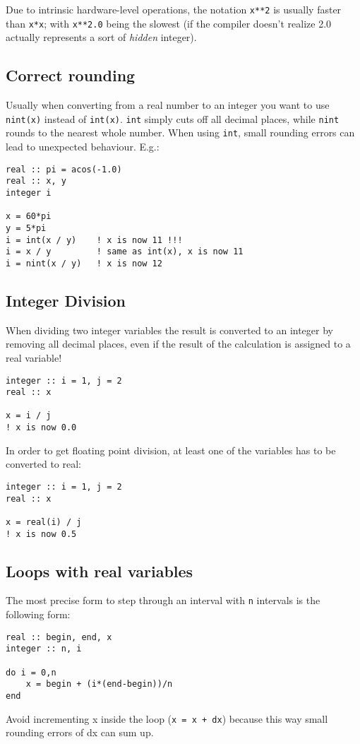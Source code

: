 \documentclass{article}
\begin{document}
Due to intrinsic hardware-level operations, the notation \verb|x**2| is usually faster than \verb|x*x|; with \verb|x**2.0| being the slowest (if the compiler doesn't realize 2.0 actually represents a sort of \emph{hidden} integer).

\subsection{Correct rounding}
Usually when converting from a real number to an integer you want to use \verb|nint(x)| instead of \verb|int(x)|. \verb|int| simply cuts off all decimal places, while \verb|nint| rounds to the nearest whole number. When using \verb|int|, small rounding errors can lead to unexpected behaviour. E.g.:

\begin{verbatim}
real :: pi = acos(-1.0)
real :: x, y
integer i

x = 60*pi
y = 5*pi
i = int(x / y)    ! x is now 11 !!!
i = x / y         ! same as int(x), x is now 11
i = nint(x / y)   ! x is now 12
\end{verbatim}

\subsection{Integer Division}

When dividing two integer variables the result is converted to an integer by removing all decimal places, even if the result of the calculation is assigned to a real variable!

\begin{verbatim}
integer :: i = 1, j = 2
real :: x

x = i / j
! x is now 0.0
\end{verbatim}

In order to get floating point division, at least one of the variables has to be converted to real:

\begin{verbatim}
integer :: i = 1, j = 2
real :: x

x = real(i) / j
! x is now 0.5
\end{verbatim}

\subsection{Loops with real variables}

The most precise form to step through an interval with \verb|n| intervals is the following form:

\begin{verbatim}
real :: begin, end, x
integer :: n, i

do i = 0,n
    x = begin + (i*(end-begin))/n
end
\end{verbatim}

Avoid incrementing x inside the loop (\verb|x = x + dx|) because this way small rounding errors of dx can sum up.
\end{document}
